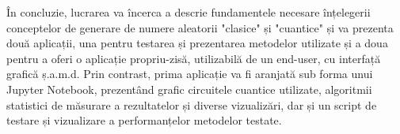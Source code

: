 În concluzie, lucrarea va încerca a descrie fundamentele necesare înțelegerii conceptelor de generare de numere aleatorii "clasice" și "cuantice" și va prezenta două aplicații, una pentru testarea și prezentarea metodelor utilizate și a doua pentru a oferi o aplicație propriu-zisă, utilizabilă de un end-user, cu interfață grafică ș.a.m.d. Prin contrast, prima aplicație va fi aranjată sub forma unui Jupyter Notebook, prezentând grafic circuitele cuantice utilizate, algoritmii statistici de măsurare a rezultatelor și diverse vizualizări, dar și un script de testare și vizualizare a performanțelor metodelor testate.




\renewcommand{\thesection}{\arabic{section}}
\renewcommand{\thesubsection}{\thesection.\arabic{subsection}}




